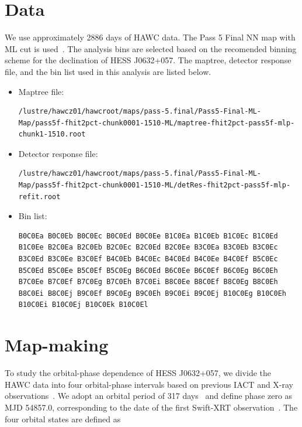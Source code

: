 \documentclass[10pt,letter]{article}
\begin{document}
\section{Data} 
We use approximately 2886 days of HAWC data. The Pass 5 Final NN map with ML cut is used~\citep{Albert2024}. The analysis bins are selected based on the recomended binning scheme for the declination of HESS J0632+057.
The maptree, detector response file, and the bin list used in this analysis are listed below.
\begin{itemize}[itemsep=0.1em]
    \item Maptree file:
    \begin{lstlisting}[style=filepath]
/lustre/hawcz01/hawcroot/maps/pass-5.final/Pass5-Final-ML-Map/pass5f-fhit2pct-chunk0001-1510-ML/maptree-fhit2pct-pass5f-mlp-chunk1-1510.root
    \end{lstlisting}
    \vspace{-0.5em}
    \item Detector response file:
    \begin{lstlisting}[style=filepath]
/lustre/hawcz01/hawcroot/maps/pass-5.final/Pass5-Final-ML-Map/pass5f-fhit2pct-chunk0001-1510-ML/detRes-fhit2pct-pass5f-mlp-refit.root
    \end{lstlisting}
    \vspace{-0.5em}
    \item Bin list:
    \begin{lstlisting}[style=filepath]
B0C0Ea B0C0Eb B0C0Ec B0C0Ed B0C0Ee B1C0Ea B1C0Eb B1C0Ec B1C0Ed B1C0Ee B2C0Ea B2C0Eb B2C0Ec B2C0Ed B2C0Ee B3C0Ea B3C0Eb B3C0Ec B3C0Ed B3C0Ee B3C0Ef B4C0Eb B4C0Ec B4C0Ed B4C0Ee B4C0Ef B5C0Ec B5C0Ed B5C0Ee B5C0Ef B5C0Eg B6C0Ed B6C0Ee B6C0Ef B6C0Eg B6C0Eh B7C0Ee B7C0Ef B7C0Eg B7C0Eh B7C0Ei B8C0Ee B8C0Ef B8C0Eg B8C0Eh B8C0Ei B8C0Ej B9C0Ef B9C0Eg B9C0Eh B9C0Ei B9C0Ej B10C0Eg B10C0Eh B10C0Ei B10C0Ej B10C0Ek B10C0El
    \end{lstlisting}
\end{itemize}
\section{Map-making} 
To study the orbital-phase dependence of HESS J0632+057, we divide the HAWC data into four orbital-phase intervals based on previous IACT and X-ray observations~\citep{Bongiorno2011, Aliu2014, Adams2021}. We adopt an orbital period of 317 days~\citep{Adams2021} and define phase zero as MJD 54857.0, corresponding to the date of the first Swift-XRT observation~\citep{Bongiorno2011}.
The four orbital states are defined as 
\end{document}
